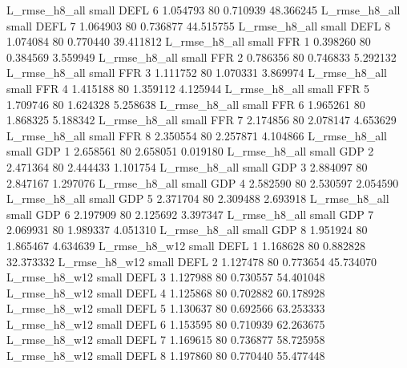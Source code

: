  L_rmse_h8_all      small     DEFL                 6 1.054793 80       0.710939          48.366245
 L_rmse_h8_all      small     DEFL                 7 1.064903 80       0.736877          44.515755
 L_rmse_h8_all      small     DEFL                 8 1.074084 80       0.770440          39.411812
 L_rmse_h8_all      small      FFR                 1 0.398260 80       0.384569           3.559949
 L_rmse_h8_all      small      FFR                 2 0.786356 80       0.746833           5.292132
 L_rmse_h8_all      small      FFR                 3 1.111752 80       1.070331           3.869974
 L_rmse_h8_all      small      FFR                 4 1.415188 80       1.359112           4.125944
 L_rmse_h8_all      small      FFR                 5 1.709746 80       1.624328           5.258638
 L_rmse_h8_all      small      FFR                 6 1.965261 80       1.868325           5.188342
 L_rmse_h8_all      small      FFR                 7 2.174856 80       2.078147           4.653629
 L_rmse_h8_all      small      FFR                 8 2.350554 80       2.257871           4.104866
 L_rmse_h8_all      small      GDP                 1 2.658561 80       2.658051           0.019180
 L_rmse_h8_all      small      GDP                 2 2.471364 80       2.444433           1.101754
 L_rmse_h8_all      small      GDP                 3 2.884097 80       2.847167           1.297076
 L_rmse_h8_all      small      GDP                 4 2.582590 80       2.530597           2.054590
 L_rmse_h8_all      small      GDP                 5 2.371704 80       2.309488           2.693918
 L_rmse_h8_all      small      GDP                 6 2.197909 80       2.125692           3.397347
 L_rmse_h8_all      small      GDP                 7 2.069931 80       1.989337           4.051310
 L_rmse_h8_all      small      GDP                 8 1.951924 80       1.865467           4.634639
 L_rmse_h8_w12      small     DEFL                 1 1.168628 80       0.882828          32.373332
 L_rmse_h8_w12      small     DEFL                 2 1.127478 80       0.773654          45.734070
 L_rmse_h8_w12      small     DEFL                 3 1.127988 80       0.730557          54.401048
 L_rmse_h8_w12      small     DEFL                 4 1.125868 80       0.702882          60.178928
 L_rmse_h8_w12      small     DEFL                 5 1.130637 80       0.692566          63.253333
 L_rmse_h8_w12      small     DEFL                 6 1.153595 80       0.710939          62.263675
 L_rmse_h8_w12      small     DEFL                 7 1.169615 80       0.736877          58.725958
 L_rmse_h8_w12      small     DEFL                 8 1.197860 80       0.770440          55.477448
